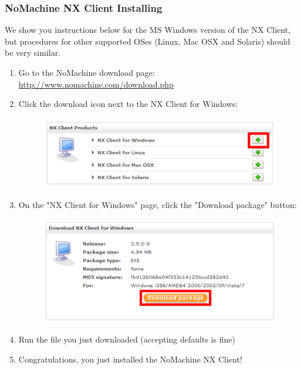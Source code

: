 \subsubsection{NoMachine NX Client Installing}
We show you instructions below for the MS Windows version of the NX Client, but
procedures for other supported OSes (Linux, Mac OSX and Solaris) should be very
similar.
\begin{enumerate}
  \item Go to the NoMachine download page: \url{http://www.nomachine.com/download.php}
  \item Click the download icon next to the NX Client for Windows:
  \begin{figure}[H]
    \centering
    \includegraphics[scale=0.5]{post-workshop/nx_client/download.png}
    \caption{\label{fig:nx_download}}
  \end{figure}
  \item On the "NX Client for Windows" page, click the "Download package" button:
  \begin{figure}[H]
    \centering
    \includegraphics[scale=0.5]{post-workshop/nx_client/download_package.png}
    \caption{\label{fig:nx_download_package}}
  \end{figure}
  \item Run the file you just downloaded (accepting defaults is fine)
  \item Congratulations, you just installed the NoMachine NX Client!
\end{enumerate}

